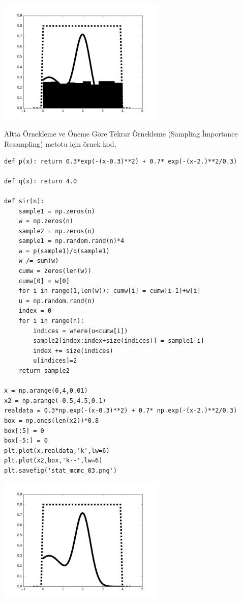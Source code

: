 \documentclass[12pt,fleqn]{article}\usepackage{../../common}
\begin{document}
\includegraphics[height=6cm]{stat_mcmc_02.png}

Altta Örnekleme ve Öneme Göre Tekrar Örnekleme (Sampling İmportance Resampling)
metotu için örnek kod,

\begin{verbatim}
def p(x): return 0.3*exp(-(x-0.3)**2) + 0.7* exp(-(x-2.)**2/0.3) 

def q(x): return 4.0

def sir(n):    
    sample1 = np.zeros(n)
    w = np.zeros(n)
    sample2 = np.zeros(n)    
    sample1 = np.random.rand(n)*4
    w = p(sample1)/q(sample1)
    w /= sum(w)
    cumw = zeros(len(w))
    cumw[0] = w[0]
    for i in range(1,len(w)): cumw[i] = cumw[i-1]+w[i]
    u = np.random.rand(n)
    index = 0
    for i in range(n):
        indices = where(u<cumw[i])
        sample2[index:index+size(indices)] = sample1[i]
        index += size(indices)
        u[indices]=2
    return sample2

x = np.arange(0,4,0.01)
x2 = np.arange(-0.5,4.5,0.1)
realdata = 0.3*np.exp(-(x-0.3)**2) + 0.7* np.exp(-(x-2.)**2/0.3) 
box = np.ones(len(x2))*0.8
box[:5] = 0
box[-5:] = 0
plt.plot(x,realdata,'k',lw=6)
plt.plot(x2,box,'k--',lw=6)
plt.savefig('stat_mcmc_03.png')
\end{verbatim}

\includegraphics[height=6cm]{stat_mcmc_03.png}
\end{document}
